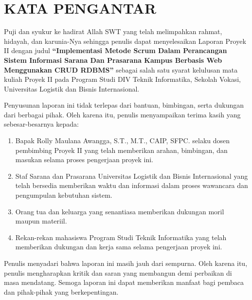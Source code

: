 \chapter*{KATA PENGANTAR}
\sloppy

Puji dan syukur ke hadirat Allah SWT yang telah melimpahkan rahmat, hidayah, dan karunia-Nya sehingga penulis dapat menyelesaikan Laporan Proyek II dengan judul \textbf{``Implementasi Metode Scrum Dalam Perancangan Sistem Informasi Sarana Dan Prasarana Kampus Berbasis Web Menggunakan CRUD RDBMS''} sebagai salah satu syarat kelulusan mata kuliah Proyek II pada Program Studi DIV Teknik Informatika, Sekolah Vokasi, Universitas Logistik dan Bisnis Internasional.

Penyusunan laporan ini tidak terlepas dari bantuan, bimbingan, serta dukungan dari berbagai pihak. Oleh karena itu, penulis menyampaikan terima kasih yang sebesar-besarnya kepada:
\begin{enumerate}
    \item Bapak Rolly Maulana Awangga, S.T., M.T., CAIP, SFPC. selaku dosen pembimbing Proyek II yang telah memberikan arahan, bimbingan, dan masukan selama proses pengerjaan proyek ini.
    \item Staf Sarana dan Prasarana Universitas Logistik dan Bisnis Internasional yang telah bersedia memberikan waktu dan informasi dalam proses wawancara dan pengumpulan kebutuhan sistem.
    \item Orang tua dan keluarga yang senantiasa memberikan dukungan moril maupun materiil.
    \item Rekan-rekan mahasiswa Program Studi Teknik Informatika yang telah memberikan dukungan dan kerja sama selama pengerjaan proyek ini.
\end{enumerate}

Penulis menyadari bahwa laporan ini masih jauh dari sempurna. Oleh karena itu, penulis mengharapkan kritik dan saran yang membangun demi perbaikan di masa mendatang. Semoga laporan ini dapat memberikan manfaat bagi pembaca dan pihak-pihak yang berkepentingan.
